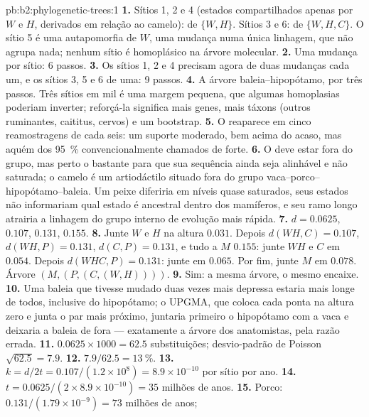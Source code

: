 \begin{solution}{pb:b2:phylogenetic-trees:1}
\textbf{1.} Sítios 1, 2 e 4 (estados compartilhados apenas por $W$ e $H$,
derivados em relação ao camelo):  de $\{W,H\}$. Sítios 3
e 6:  de $\{W,H,C\}$. O sítio 5 é uma autapomorfia de
$W$, uma mudança numa única linhagem, que não agrupa nada; nenhum sítio é
homoplásico na árvore molecular.
\textbf{2.} Uma mudança por sítio: 6 passos.
\textbf{3.} Os sítios 1, 2 e 4 precisam agora de duas mudanças cada um,
e os sítios 3, 5 e 6 de uma: 9 passos.
\textbf{4.} A árvore baleia--hipopótamo, por três passos. Três sítios em
mil é uma margem pequena, que algumas homoplasias poderiam inverter;
reforçá-la significa mais genes, mais táxons (outros ruminantes,
caititus, cervos) e um bootstrap.
\textbf{5.} O  reaparece em cinco reamostragens de cada seis: um
suporte moderado, bem acima do acaso, mas aquém dos \qty{95}{\%}
convencionalmente chamados de forte.
\textbf{6.} O  deve estar fora do grupo, mas perto o
bastante para que sua sequência ainda seja alinhável e não saturada; o
camelo é um artiodáctilo situado fora do grupo vaca--porco--hipopótamo--baleia. Um
peixe diferiria em níveis quase saturados, seus estados não
informariam qual estado é ancestral dentro dos mamíferos,
e seu ramo longo atrairia a linhagem do grupo interno de evolução mais
rápida.
\textbf{7.} $d = 0.0625$, $0.107$, $0.131$, $0.155$.
\textbf{8.} Junte $W$ e $H$ na altura $0.031$. Depois $d(WH,C) =
0.107$, $d(WH,P) = 0.131$, $d(C,P) = 0.131$, e tudo a $M$
$0.155$: junte $WH$ e $C$ em $0.054$. Depois $d(WHC,P) = 0.131$: junte
em $0.065$. Por fim, junte $M$ em $0.078$. Árvore $(M,(P,(C,(W,H))))$.
\textbf{9.} Sim: a mesma árvore, o mesmo encaixe.
\textbf{10.} Uma baleia que tivesse mudado duas vezes mais depressa
estaria mais longe de todos, inclusive do hipopótamo; o UPGMA, que coloca
cada ponta na altura zero e junta o par mais próximo, juntaria primeiro o
hipopótamo com a vaca e deixaria a baleia de fora --- exatamente a
árvore dos anatomistas, pela razão errada.
\textbf{11.} $0.0625\times 1000 = 62.5$ substituições; desvio-padrão
de Poisson $\sqrt{62.5} = 7.9$.
\textbf{12.} $7.9/62.5 = \qty{13}{\%}$.
\textbf{13.} $k = d/2t = 0.107/(1.2\times 10^{8}) = 8.9\times 10^{-10}$
por sítio por ano.
\textbf{14.} $t = 0.0625/(2\times 8.9\times 10^{-10}) = 35$ milhões
de anos.
\textbf{15.} Porco: $0.131/(1.79\times 10^{-9}) = 73$ milhões de anos;

\end{solution}
